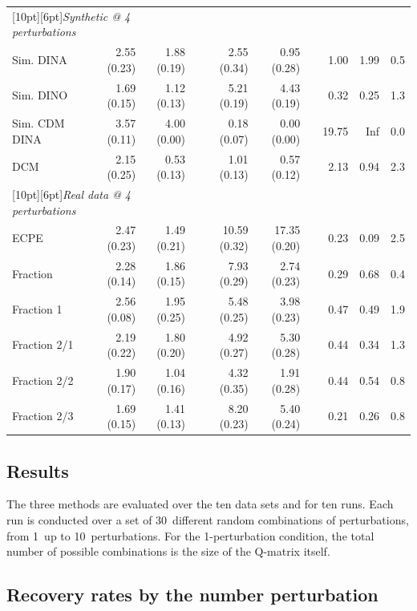 \begin{table}
\begin{tabular}{lrrrrrrrrr}
  \hline
  \hline
  \multicolumn{2}{l}{\raisebox{0pt}[10pt][6pt]{\textit{Synthetic @ 4 perturbations}}}\\
  Sim. DINA     & 2.55 (0.23) & 1.88 (0.19) && 2.55 (0.34) &  0.95 (0.28) && 1.00 & 1.99 & 0.5\\ 
  Sim. DINO     & 1.69 (0.15) & 1.12 (0.13) && 5.21 (0.19) &  4.43 (0.19) && 0.32 & 0.25 & 1.3\\
  Sim. CDM DINA & 3.57 (0.11) & 4.00 (0.00) && 0.18 (0.07) &  0.00 (0.00) &&19.75 &  Inf & 0.0\\ 
  DCM           & 2.15 (0.25) & 0.53 (0.13) && 1.01 (0.13) &  0.57 (0.12) && 2.13 & 0.94 & 2.3\\ 
  \hline
  \multicolumn{2}{l}{\raisebox{0pt}[10pt][6pt]{\textit{Real data @ 4 perturbations}}}\\
  ECPE          & 2.47 (0.23) & 1.49 (0.21) &&10.59 (0.32) & 17.35 (0.20) && 0.23 & 0.09 & 2.5\\ 
  Fraction      & 2.28 (0.14) & 1.86 (0.15) && 7.93 (0.29) &  2.74 (0.23) && 0.29 & 0.68 & 0.4\\ 
  Fraction 1    & 2.56 (0.08) & 1.95 (0.25) && 5.48 (0.25) &  3.98 (0.23) && 0.47 & 0.49 & 1.9\\ 
  Fraction 2/1  & 2.19 (0.22) & 1.80 (0.20) && 4.92 (0.27) &  5.30 (0.28) && 0.44 & 0.34 & 1.3\\ 
  Fraction 2/2  & 1.90 (0.17) & 1.04 (0.16) && 4.32 (0.35) &  1.91 (0.28) && 0.44 & 0.54 & 0.8\\ 
  Fraction 2/3  & 1.69 (0.15) & 1.41 (0.13) && 8.20 (0.23) &  5.40 (0.24) && 0.21 & 0.26 & 0.8\\ 
  \hline
  \hline
\end{tabular}
\end{table} 

\subsection{Results}

The three methods are evaluated over the ten data sets and for ten runs.  Each run is conducted over a set of 30~different random combinations of perturbations, from 1~up to 10~perturbations.  For the 1-perturbation condition, the total number of possible combinations is the size of the Q-matrix itself.

\subsection{Recovery rates by the number perturbation}

